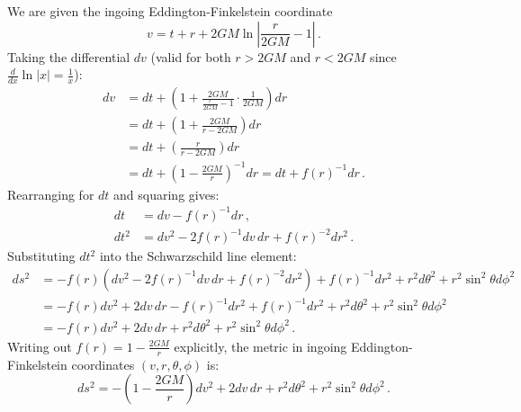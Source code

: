 \documentclass[12pt]{article}
\newcommand{\be}{\begin{equation}}
\newcommand{\ee}{\end{equation}}
\begin{document}
\begin{enumerate}[label=\alph*)]
We are given the ingoing Eddington-Finkelstein coordinate
\be
v = t + r + 2GM \ln\left| \frac{r}{2GM} - 1 \right| \,.
\ee
Taking the differential $dv$ (valid for both $r > 2GM$ and $r < 2GM$ since $\frac{d}{dx}\ln|x| = \frac{1}{x}$):
\begin{align}
dv &= dt + \left( 1 + \frac{2GM}{\frac{r}{2GM} - 1} \cdot \frac{1}{2GM} \right) dr \nonumber \\
&= dt + \left( 1 + \frac{2GM}{r - 2GM} \right) dr \nonumber \\
&= dt + \left( \frac{r}{r - 2GM} \right) dr \nonumber \\
&= dt + \left( 1 - \frac{2GM}{r} \right)^{-1} dr = dt + f(r)^{-1} dr \,.
\end{align}
Rearranging for $dt$ and squaring gives:
\begin{align}
dt &= dv - f(r)^{-1} dr \,, \\
dt^2 &= dv^2 - 2 f(r)^{-1} dv\, dr + f(r)^{-2} dr^2 \,.
\end{align}
Substituting $dt^2$ into the Schwarzschild line element:
\begin{align}
ds^2 &= -f(r) \left( dv^2 - 2 f(r)^{-1} dv\, dr + f(r)^{-2} dr^2 \right) + f(r)^{-1} dr^2 + r^2 d\theta^2 + r^2 \sin^2\theta d\phi^2 \nonumber \\
&= -f(r) dv^2 + 2 dv\, dr - f(r)^{-1} dr^2 + f(r)^{-1} dr^2 + r^2 d\theta^2 + r^2 \sin^2\theta d\phi^2 \nonumber \\
&= -f(r) dv^2 + 2 dv\, dr + r^2 d\theta^2 + r^2 \sin^2\theta d\phi^2 \,.
\end{align}
Writing out $f(r) = 1 - \frac{2GM}{r}$ explicitly, the metric in ingoing Eddington-Finkelstein coordinates $(v,r,\theta,\phi)$ is:
\be
\boxed{ds^2 = -\left( 1 - \frac{2GM}{r} \right) dv^2 + 2 dv\, dr + r^2 d\theta^2 + r^2 \sin^2\theta d\phi^2 \,.}
\label{eq:ef_metric}
\ee


\end{enumerate}
\end{document}
